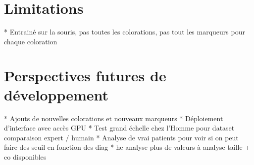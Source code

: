 \section{Limitations}
* Entrainé sur la souris, pas toutes les colorations, pas tout les marqueurs pour chaque coloration

\section{Perspectives futures de développement}
* Ajouts de nouvelles colorations et nouveaux marqueurs
* Déploiement d'interface avec accès GPU
* Test grand échelle chez l'Homme pour dataset comparaison expert / humain
* Analyse de vrai patients pour voir si on peut faire des seuil en fonction des diag
* he analyse plus de valeurs à analyse taille + co disponibles
